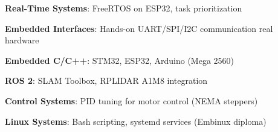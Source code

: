 \begin{cvitems}
  \vspace {1.7mm}
  \item \textbf{Real-Time Systems}: FreeRTOS on ESP32, task prioritization
  \item \textbf{Embedded Interfaces}: Hands-on UART/SPI/I2C communication real hardware
  \item \textbf{Embedded C/C++}: STM32, ESP32, Arduino (Mega 2560)
  \item \textbf{ROS 2}: SLAM Toolbox, RPLIDAR A1M8 integration
  \item \textbf{Control Systems}: PID tuning for motor control (NEMA steppers)
  \item \textbf{Linux Systems}: Bash scripting, systemd services (Embinux diploma)
\end{cvitems}